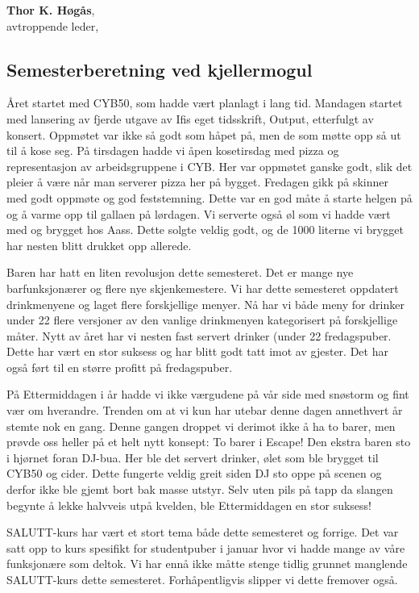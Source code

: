 \documentclass[10pt,norsk,a4paper]{article}
\begin{document}
\textbf{Thor K. Høgås}, \\
avtroppende leder, \date{\emph{23. mai 2019}}

\newpage

\subsection{Semesterberetning ved kjellermogul}

\begin{multicols}{2}
Året startet med CYB50, som hadde vært planlagt i lang tid. Mandagen startet
med lansering av fjerde utgave av Ifis eget tidsskrift, Output, etterfulgt av
konsert. Oppmøtet var ikke så godt som håpet på, men de som møtte opp så ut
til å kose seg. På tirsdagen hadde vi åpen kosetirsdag med pizza og representasjon
av arbeidsgruppene i CYB. Her var oppmøtet ganske godt, slik det pleier å være
når man serverer pizza her på bygget. Fredagen gikk på skinner med godt oppmøte
og god feststemning. Dette var en god måte å starte helgen på og å varme opp til
gallaen på lørdagen. Vi serverte også øl som vi hadde vært med og brygget hos Aass.
Dette solgte veldig godt, og de 1000 literne vi brygget har nesten blitt
drukket opp allerede.

Baren har hatt en liten revolusjon dette semesteret. Det er mange nye
barfunksjonærer og flere nye skjenkemestere. Vi har dette semesteret
oppdatert drinkmenyene og laget flere forskjellige menyer. Nå har vi
både meny for drinker under 22%
flere versjoner av den vanlige drinkmenyen kategorisert på forskjellige
måter. Nytt av året har vi nesten fast servert drinker (under 22%
fredagspuber. Dette har vært en stor suksess og har blitt godt tatt imot
av gjester. Det har også ført til en større profitt på fredagspuber.

På Ettermiddagen i år hadde vi ikke værgudene på vår side med snøstorm
og fint vær om hverandre. Trenden om at vi kun har utebar denne dagen
annethvert år stemte nok en gang. Denne gangen droppet vi derimot ikke
å ha to barer, men prøvde oss heller på et helt nytt konsept: To barer
i Escape! Den ekstra baren sto i hjørnet foran DJ-bua. Her ble det
servert drinker, ølet som ble brygget til CYB50 og cider. Dette fungerte
veldig greit siden DJ sto oppe på scenen og derfor ikke ble gjemt bort bak
masse utstyr. Selv uten pils på tapp da slangen begynte å lekke halvveis
utpå kvelden, ble Ettermiddagen en stor suksess!

SALUTT-kurs har vært et stort tema både dette semesteret og forrige.
Det var satt opp to kurs spesifikt for studentpuber i januar hvor vi
hadde mange av våre funksjonære som deltok. Vi har ennå ikke måtte
stenge tidlig grunnet manglende SALUTT-kurs dette semesteret.
Forhåpentligvis slipper vi dette fremover også.


\end{multicols}
\end{document}
